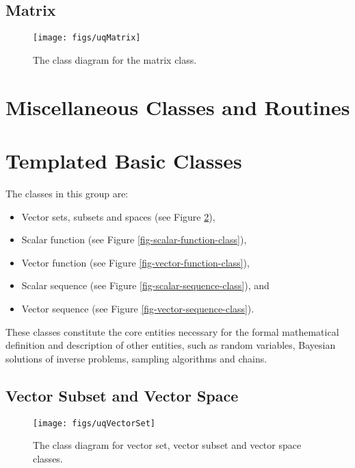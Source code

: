 \clearpage
\subsection{Matrix}

\begin{figure}[h!]
\centerline{
\texttt{[image: figs/uqMatrix]}
}
\caption{
The class diagram for the matrix class.
}
\label{fig-matrix-class}
\end{figure}

\clearpage
\section{Miscellaneous Classes and Routines}

\clearpage
\section{Templated Basic Classes}

The classes in this group are:
\begin{itemize}
\item Vector sets, subsets and spaces (see Figure \ref{fig-vector-space-subset-classes}),
\item Scalar function (see Figure \ref{fig-scalar-function-class}),
\item Vector function (see Figure \ref{fig-vector-function-class}),
\item Scalar sequence (see Figure \ref{fig-scalar-sequence-class}), and
\item Vector sequence (see Figure \ref{fig-vector-sequence-class}).
\end{itemize}
These classes constitute the core entities necessary for the formal
mathematical definition and description of other entities, such as
random variables, Bayesian solutions of inverse problems, sampling algorithms and chains.

\clearpage
\subsection{Vector Subset and Vector Space}

\begin{figure}[h!]
\centerline{
\texttt{[image: figs/uqVectorSet]}
}
\caption{
The class diagram for vector set, vector subset and vector space classes.
}
\label{fig-vector-space-subset-classes}
\end{figure}

